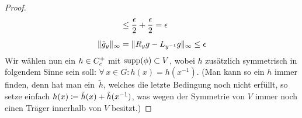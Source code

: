 \begin{proof}
\begin{align*}
        &\leq \frac{\epsilon}{2} + \frac{\epsilon}{2} = \epsilon        %
        \\[1ex]
        \supnorm{ \tilde g_y }                                          %
        &=    \supnorm{ R_yg - L_{y^{-1}}g }                            %
         \leq \epsilon                                                  %
    \end{align*}
    Wir wählen nun ein $h\in C_c^+$ mit $\operatorname{supp}(\phi)\subset V$, wobei $h$
    zusätzlich symmetrisch in folgendem Sinne sein soll: $\forall\,x\in G\colon
    h(x) = h(x^{-1})$. (Man kann so ein $h$ immer finden, denn hat man ein~$\tilde h$,
    welches die letzte Bedingung noch nicht erfüllt, so setze einfach 
    $h(x) \coloneqq \tilde h(x) + \tilde h(x^{-1})$, was wegen der Symmetrie von
    $V$ immer noch einen Träger innerhalb von $V$ besitzt.)
    

\end{proof}
